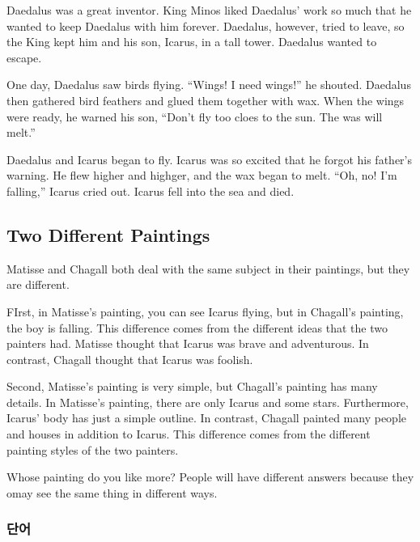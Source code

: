 \documentclass[9pt, a4paper]{oblivoir}
\begin{document}
    Daedalus was a great inventor. King Minos liked Daedalus' work so much that he wanted to keep Daedalus with him forever. 
    Daedalus, however, tried to leave, so the King kept him and his son, Icarus, in a tall tower.
    Daedalus wanted to escape. 

    One day, Daedalus saw birds flying. ``Wings! I need wings!'' he shouted. Daedalus then gathered bird feathers and glued them together with wax.
    When the wings were ready, he warned his son, ``Don't fly too cloes to the sun. The was will melt.''

    Daedalus and Icarus began to fly. Icarus was so excited that he forgot his father's warning. He flew higher and highger, and the wax began to melt. 
    ``Oh, no! I'm falling,'' Icarus cried out. Icarus fell into the sea and died.

    \subsection*{Two Different Paintings}

    Matisse and Chagall both deal with the same subject in their paintings, but they are different. 

    FIrst, in Matisse's painting, you can see Icarus flying, but in Chagall's painting, the boy is falling. This difference comes from the different ideas that the two painters had.
    Matisse thought that Icarus was brave and adventurous. In contrast, Chagall thought that Icarus was foolish.

    Second, Matisse's painting is very simple, but Chagall's painting has many details. In Matisse's painting, there are only Icarus and some stars. Furthermore, Icarus' body has just a simple outline. In contrast, Chagall painted many people and houses in addition to Icarus. This difference comes from the different painting styles of the two painters. \newline

    Whose painting do you like more? People will have different answers because they omay see the same thing in different ways. 
    \vspace*{9cm}
    \subsubsection*{단어}
\end{document}
